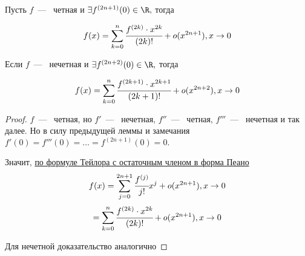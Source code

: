 \begin{lemma}
	Пусть $f$~---~ четная и $\exists f^{(2n + 1)}(0) \in \R,$ тогда 
	
	$$f(x) = \sum\limits_{k = 0}^{n} \cfrac{f^{(2k)} \cdot x^{2k}}{(2k)!} + o(x^{2n+1}), x\to 0$$ 
	
	Если $f$~---~ нечетная и $\exists f^{(2n + 2)}(0) \in \R,$ тогда 
	
	$$f(x) = \sum\limits_{k = 0}^{n} \cfrac{f^{(2k+1)} \cdot x^{2k+1}}{(2k+1)!} + o(x^{2n+2}), x\to 0$$ 
\end{lemma}
\begin{proof}
	$f$~---~ четная, но $f'$~---~ нечетная, $f''$~---~ четная, $f'''$~---~ нечетная и так далее. Но в силу предыдущей леммы и замечания $f'(0) = f'''(0) = \ldots = f^{(2n+1)}(0) = 0.$ 
	
	Значит, \hyperlink{thrm7.1}{по формуле Тейлора с остаточным членом в форма Пеано} $$f(x) = \sum\limits_{j = 0}^{2n+1} \cfrac{f^{(j)}}{j!} x^{j} + o(x^{2n+1}), x\to 0$$
	$$= \sum\limits_{k = 0}^{n} \cfrac{f^{(2k)} \cdot x^{2k}}{(2k)!} + o(x^{2n+1}), x\to 0$$
	
	Для нечетной доказательство аналогично
\end{proof}

